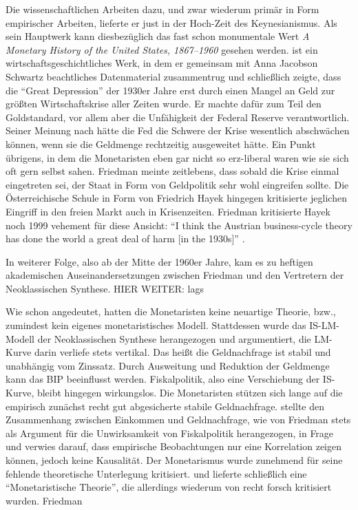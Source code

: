 Die wissenschaftlichen Arbeiten dazu, und zwar wiederum primär in Form empirischer Arbeiten, lieferte er just in der Hoch-Zeit des Keynesianismus. Als sein Hauptwerk kann diesbezüglich das fast schon monumentale Wert \textit{A Monetary History of the United States, 1867–1960} gesehen werden. \textcite{Friedman1963} ist ein wirtschaftsgeschichtliches Werk, in dem er gemeinsam mit Anna Jacobson Schwartz beachtliches Datenmaterial zusammentrug und schließlich zeigte, dass die "`Great Depression"' der 1930er Jahre erst durch einen Mangel an Geld zur größten Wirtschaftskrise aller Zeiten wurde. Er machte dafür zum Teil den Goldstandard, vor allem aber die Unfähigkeit der Federal Reserve verantwortlich. Seiner Meinung nach hätte die Fed die Schwere der Krise wesentlich abschwächen können, wenn sie die Geldmenge rechtzeitig ausgeweitet hätte. Ein Punkt übrigens, in dem die Monetaristen eben gar nicht so erz-liberal waren wie sie sich oft gern selbst sahen. Friedman meinte zeitlebens, dass sobald die Krise einmal eingetreten sei, der Staat in Form von Geldpolitik sehr wohl eingreifen sollte. Die Österreichische Schule in Form von Friedrich Hayek hingegen kritisierte jeglichen Eingriff in den freien Markt auch in Krisenzeiten. Friedman kritisierte Hayek noch 1999 vehement für diese Ansicht: "`I think the Austrian business-cycle theory has done the world a great deal of harm [in the 1930s]"' \parencite{Epstein1999}.

In weiterer Folge, also ab der Mitte der 1960er Jahre, kam es zu heftigen akademischen Auseinandersetzungen zwischen Friedman und den Vertretern der Neoklassischen Synthese. HIER WEITER: lags


Wie schon angedeutet, hatten die Monetaristen keine neuartige Theorie, bzw., zumindest kein eigenes monetaristisches Modell. Stattdessen wurde das IS-LM-Modell der Neoklassischen Synthese herangezogen und argumentiert, die LM-Kurve darin verliefe stets vertikal. Das heißt die Geldnachfrage ist stabil und unabhängig vom Zinssatz. Durch Ausweitung und Reduktion der Geldmenge kann das BIP beeinflusst werden. Fiskalpolitik, also eine Verschiebung der IS-Kurve, bleibt hingegen wirkungslos. Die Monetaristen stützen sich lange auf die empirisch zunächst recht gut abgesicherte stabile Geldnachfrage. \textcite{Tobin1970} stellte den Zusammenhang zwischen Einkommen und Geldnachfrage, wie von Friedman stets als Argument für die Unwirksamkeit von Fiskalpolitik herangezogen, in Frage und verwies darauf, dass empirische Beobachtungen nur eine Korrelation zeigen können, jedoch keine Kausalität. Der Monetarismus wurde zunehmend für seine fehlende theoretische Unterlegung kritisiert. \textcite{Friedman1970} und \textcite{Friedman1971} lieferte schließlich eine "`Monetaristische Theorie"', die allerdings wiederum von \textcite{Tobin1972} recht forsch kritisiert wurden. Friedman 




